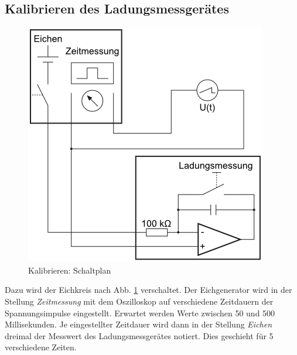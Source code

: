 \documentclass[12pt,a4paper,titlepage,headinclude,bibtotoc]{scrartcl}
\begin{document}
\subsection{Kalibrieren des Ladungsmessgerätes}
\begin{figure}[!htb]
	\centering
	\includegraphics[scale=1.0]{Eichen.png}
	\caption{Kalibrieren: Schaltplan \cite[Datum: 25.09.2014]{LP11}}
	\label{fig:Eichkreis}
\end{figure}

Dazu wird der Eichkreis nach Abb. \ref{fig:Eichkreis} verschaltet.
Der Eichgenerator wird in der Stellung \emph{Zeitmessung} mit dem Oszilloskop auf verschiedene Zeitdauern der Spannungsimpulse eingestellt.
Erwartet werden Werte zwischen 50 und 500 Millisekunden.
Je eingestellter Zeitdauer wird dann in der Stellung \emph{Eichen} dreimal der Messwert des Ladungsmessgerätes notiert.
Dies geschieht für 5 verschiedene Zeiten.
\end{document}
